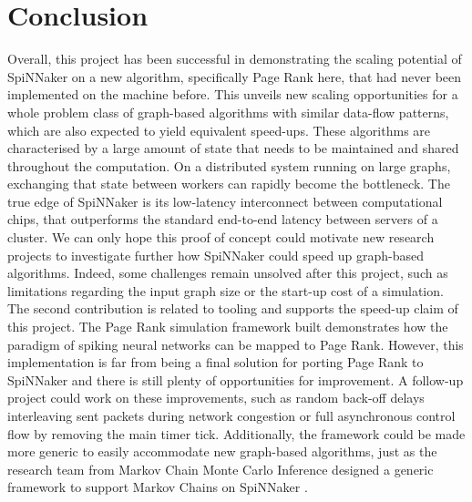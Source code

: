 \section{Conclusion}

Overall, this project has been successful in demonstrating the scaling potential of SpiNNaker on a new algorithm, specifically Page Rank here, that had never been implemented on the machine before. This unveils new scaling opportunities for a whole problem class of graph-based algorithms with similar data-flow patterns, which are also expected to yield equivalent speed-ups. These algorithms are characterised by a large amount of state that needs to be maintained and shared throughout the computation. On a distributed system running on large graphs, exchanging that state between workers can rapidly become the bottleneck. The true edge of SpiNNaker is its low-latency interconnect between computational chips, that outperforms the standard end-to-end latency between servers of a cluster. We can only hope this proof of concept could motivate new research projects to investigate further how SpiNNaker could speed up graph-based algorithms. Indeed, some challenges remain unsolved after this project, such as limitations regarding the input graph size or the start-up cost of a simulation. \\

The second contribution is related to tooling and supports the speed-up claim of this project. The Page Rank simulation framework built demonstrates how the paradigm of spiking neural networks can be mapped to Page Rank. However, this implementation is far from being a final solution for porting Page Rank to SpiNNaker and there is still plenty of opportunities for improvement. A follow-up project could work on these improvements, such as random back-off delays interleaving sent packets during network congestion or full asynchronous control flow by removing the main timer tick. Additionally, the framework could be made more generic to easily accommodate new graph-based algorithms, just as the research team from Markov Chain Monte Carlo Inference designed a generic framework to support Markov Chains on SpiNNaker \cite{markov-on-spinn}. \\





